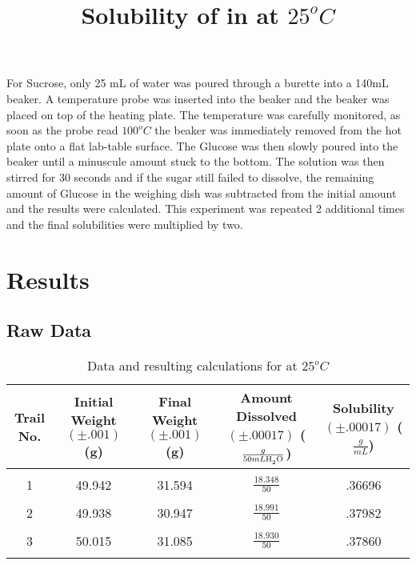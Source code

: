 \documentclass{article}
\begin{document}
For Sucrose, only 25 mL of water was poured through a burette into a 140mL beaker.  A temperature probe was inserted into the beaker and the beaker was placed on top of the heating plate. The temperature was carefully monitored, as soon as the probe read $100^o C$ the beaker was immediately removed from the hot plate onto a flat lab-table surface. The Glucose was then slowly poured into the beaker until a minuscule amount stuck to the bottom. The solution was then stirred for 30 seconds and if the sugar still failed to dissolve, the remaining amount of Glucose in the weighing dish was subtracted from the initial amount and the results were calculated. This experiment was repeated 2 additional times and the final solubilities were multiplied by two. 
 \section*{Results}
 \subsection*{Raw Data}
\begin{table}[H]
	\centering 
	\small
	\title{Solubility of  in  at $25^o C$} 
	\tabcolsep=0.11cm 
	\begin{tabular}{ccccc} \\
	Trail No. & Initial Weight $(\pm .001)$ (g) & Final Weight $(\pm .001)$ (g) & Amount Dissolved $(\pm .00017)$ ($\frac{g}{50mL \ce{H_2O}}$) & Solubility $(\pm .00017)$ ($\frac{g}{mL}$) \\ \hline \\
		1 & 49.942 & 31.594 & $\frac{18.348}{50}$ & .36696 \\\\ 
		2 & 49.938 & 30.947 & $\frac{18.991}{50}$ & .37982 \\\\ 
		3 & 50.015 & 31.085 & $\frac{18.930}{50}$ & .37860 \\\\
	\end{tabular}
	\caption{Data and resulting calculations for  at $25^o C$} 
	\end{table} 
\end{document}
